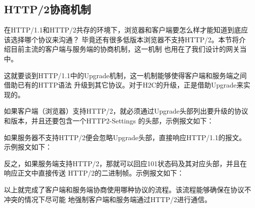 \documentclass[twoside]{CUGThesis}
\begin{document}
	\subsection{HTTP/2协商机制}
	在HTTP/1.1和HTTP/2共存的环境下，浏览器和客户端要怎么样才能知道到底应该选择哪个协议来沟通？
	毕竟还有很多低版本浏览器不支持HTTP/2。本节将介绍目前主流的客户端与服务端的协商机制，这一机制
	也用在了我们设计的网关当中。\par 
	这就要谈到HTTP/1.1中的Upgrade机制，这一机制能够使得客户端和服务端之间借助已有的HTTP语法
	升级到其它协议。对于H2C的升级，正是借助Upgrade来实现的\cite{fielding2014hypertext}。\par 
	如果客户端（浏览器）支持HTTP/2，就必须通过Upgrade头部列出要升级的协议和版本，并且还要包含一个HTTP2-Settings
	的头部，示例报文如下：\\
	 \par
	如果服务器不支持HTTP/2便会忽略Upgrade头部，直接响应HTTP/1.1的报文。示例报文如下：\\
	 \par
	反之，如果服务端支持HTTP/2，那就可以回应101状态码及其对应头部，并且在响应正文中直接传送
	HTTP/2的二进制帧。示例报文如下：\\
	 \par
	以上就完成了客户端和服务端协商使用哪种协议的流程。该流程能够确保在协议不冲突的情况下尽可能
	地强制客户端和服务端通过HTTP/2进行通信。
\end{document}
